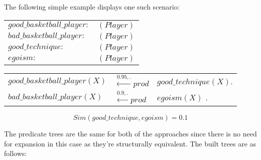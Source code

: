 \begin{ex}
The following simple example displays one such scenario:

\begin{center}
\begin{tabular}{l l}
$good\_basketball\_player:$  & $(Player)$\\

$bad\_basketball\_player:$ &  $(Player)$\\

$good\_technique:$ &  $(Player)$\\

$egoism:$ &  $(Player)$\\

\end{tabular}
\end{center}
\begin{tabular}{l l l}
$good\_basketball\_player(X)$ & $\stackrel{0.95,.}{\longleftarrow} prod$ & $good\_technique(X)$.\\

$bad\_basketball\_player(X)$ & $\stackrel{0.9,.}{\longleftarrow} prod$ & $egoism(X)$ .\\

\end{tabular}
\[Sim(good\_technique, egoism) = 0.1\]

\end{ex}

The predicate trees are the same for both of the approaches since there is no need for expansion in this case as they're structurally equivalent. The built trees are as follows: 



